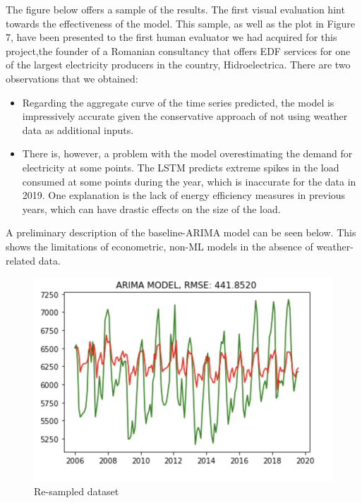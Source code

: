 \documentclass[10pt,twocolumn,letterpaper]{article}
\begin{document}
The figure below offers a sample of the results. The first visual evaluation hint towards the effectiveness of the model. This sample, as well as the plot in Figure 7, have been presented to the first human evaluator we had acquired for this project,the founder of a Romanian consultancy that offers EDF services for one of the largest electricity producers in the country, Hidroelectrica. There are two observations that we obtained: 
\begin{itemize}
\item Regarding the aggregate curve of the time series predicted, the model is impressively accurate given the conservative approach of not using weather data as additional inputs.
\item There is, however, a problem with the model overestimating the demand for electricity at some points. The LSTM predicts extreme spikes in the load consumed at some points during the year, which is inaccurate for the data in 2019. One explanation is the lack of energy efficiency measures in previous years, which can have drastic effects on the size of the load. 
\end{itemize}

A preliminary description of the baseline-ARIMA model can be seen below. This shows the limitations of econometric, non-ML models in the absence of weather-related data.


\begin{figure}[H]
\begin{center}
   \includegraphics[width=\linewidth]{midterm-report-latex/ARIMA.png}
\end{center}
   \caption{Re-sampled dataset}
\end{figure}
\end{document}
